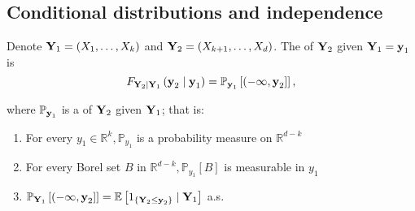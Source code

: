 \subsection*{Conditional distributions and independence}
Denote $\boldsymbol{\mathbf{Y}}_{1}=\left(X_{1}, \ldots, X_{k}\right)$ and $\boldsymbol{\mathbf{Y}}_{2}=\left(X_{k+1}, \ldots, X_{d}\right)$. The  of $\boldsymbol{\mathbf{Y}}_{2}$ given $\boldsymbol{\mathbf{Y}}_{1}=\boldsymbol{\mathbf{y}}_{1}$ is
$$
F_{\boldsymbol{\mathbf{Y}}_{2} \mid \boldsymbol{\mathbf{Y}}_{1}}\left(\boldsymbol{\mathbf{y}}_{2} \mid \boldsymbol{\mathbf{y}}_{1}\right)=\mathbb{P}_{\boldsymbol{\mathbf{y}}_{1}}\left[\left(-\infty, \boldsymbol{\mathbf{y}}_{2}\right]\right],
$$

where $\mathbb{P}_{\boldsymbol{\mathbf{y}}_{1}}$ is a  of $\boldsymbol{\mathbf{Y}}_{2}$ given $\boldsymbol{\mathbf{Y}}_{1}$; that is:
\begin{enumerate}[label = (\arabic*), leftmargin=*]
    \item For every $y_{1} \in \mathbb{R}^{k}, \mathbb{P}_{y_{1}}$ is a probability measure on $\mathbb{R}^{d-k}$
    \item For every Borel set $B$ in $\mathbb{R}^{d-k}, \mathbb{P}_{y_{1}}[B]$ is measurable in $y_{1}$
    \item $\mathbb{P}_{\boldsymbol{\mathbf{Y}}_{1}}\left[\left(-\infty, \boldsymbol{\mathbf{y}}_{2}\right]\right]=\mathbb{E}\left[1_{\left\{\boldsymbol{\mathbf{Y}}_{2} \leq \boldsymbol{\mathbf{y}}_{2}\right\}} \mid \boldsymbol{\mathbf{Y}}_{1}\right]$ a.s.
\end{enumerate}





